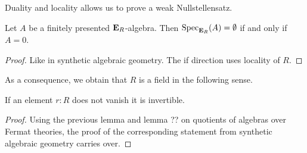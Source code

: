 {Duality and locality allows us to prove a weak Nullstellensatz.

\begin{lemma}
  Let \(A\) be a finitely presented \(\mathbf{E}_R\)-algebra.
  Then \(\operatorname{Spec}_{\mathbf{E}_R}(A)=\emptyset\) if and only if \(A=0\).
\end{lemma}
\begin{proof}
  Like in synthetic algebraic geometry.
  The if direction uses locality of \(R\).
\end{proof}

As a consequence, we obtain that \(R\) is a field in the following sense.

\begin{lemma}
  If an element \(r:R\) does not vanish it is invertible.
\end{lemma}
\begin{proof}
  Using the previous lemma and lemma ?? on quotients of algebras over Fermat theories, the proof of the corresponding statement from synthetic algebraic geometry carries over.
\end{proof}

}
